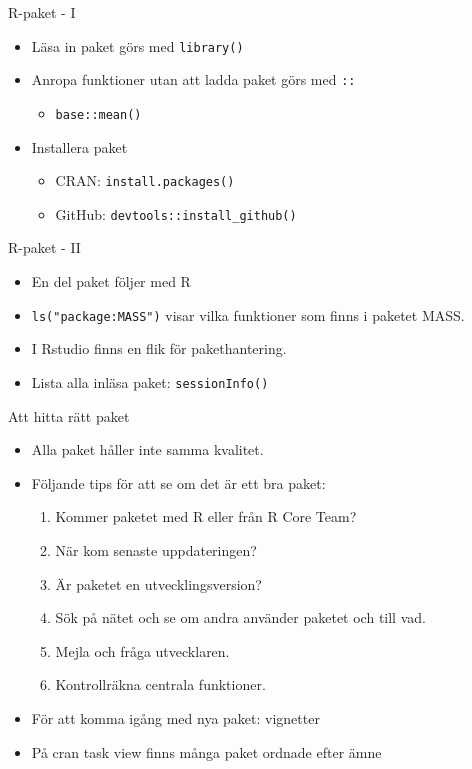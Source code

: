 \documentclass[
  11pt,
  ignorenonframetext,
]{beamer}
\providecommand{\tightlist}{%
  \setlength{\itemsep}{0pt}\setlength{\parskip}{0pt}}
\begin{document}
\begin{frame}{R-paket - I}
\label{r-paket---i}
\begin{itemize}
\tightlist
\item
  Läsa in paket görs med \texttt{library()}
\item
  Anropa funktioner utan att ladda paket görs med \texttt{::}

  \begin{itemize}
  \tightlist
  \item
    \texttt{base::mean()}
  \end{itemize}
\item
  Installera paket

  \begin{itemize}
  \tightlist
  \item
    CRAN: \texttt{install.packages()}
  \item
    GitHub: \texttt{devtools::install\_github()}
  \end{itemize}
\end{itemize}
\end{frame}

\begin{frame}{R-paket - II}
\label{r-paket---ii}
\begin{itemize}
\tightlist
\item
  En del paket följer med R
\item
  \texttt{ls("package:MASS")} visar vilka funktioner som finns i paketet
  MASS.
\item
  I Rstudio finns en flik för pakethantering.
\item
  Lista alla inläsa paket: \texttt{sessionInfo()}
\end{itemize}
\end{frame}

\begin{frame}{Att hitta rätt paket}
\label{att-hitta-ruxe4tt-paket}
\begin{itemize}
\tightlist
\item
  Alla paket håller inte samma kvalitet.
\item
  Följande tips för att se om det är ett bra paket:

  \begin{enumerate}
  \tightlist
  \item
    Kommer paketet med R eller från R Core Team?
  \item
    När kom senaste uppdateringen?
  \item
    Är paketet en utvecklingsversion?
  \item
    Sök på nätet och se om andra använder paketet och till vad.
  \item
    Mejla och fråga utvecklaren.
  \item
    Kontrollräkna centrala funktioner.
  \end{enumerate}
\item
  För att komma igång med nya paket: vignetter
\item
  På cran task view finns många paket ordnade efter ämne
\end{itemize}
\end{frame}
\end{document}
